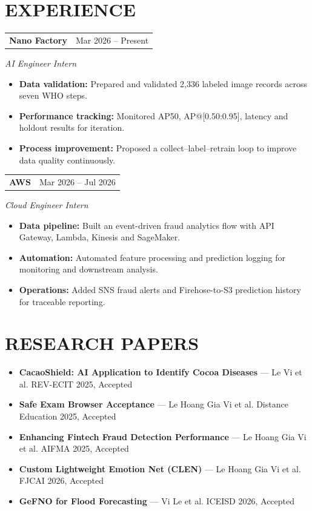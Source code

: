 \documentclass[10pt,letterpaper]{article}
\makeatletter
\newcommand{\cvsection}[2]{\section*{\faIcon{#1}\hspace{0.45em}#2}}
\newcommand{\cvjobentry}[3]{%
  \begin{tabularx}{\textwidth}{@{}X>{\raggedleft\arraybackslash}p{1.52in}@{}}
    \textbf{#1} & \normalsize #2 \\
  \end{tabularx}\par
  \vspace{0.10em}\normalsize\textit{#3}\par\vspace{0.08em}
}
\newcommand{\paperentry}[3]{%
  \item \small \textbf{#1} --- #2 \hfill #3
}
\makeatother
\begin{document}
\cvsection{briefcase}{EXPERIENCE}
\cvjobentry{Nano Factory}{Mar 2026 -- Present}{AI Engineer Intern}
\begin{itemize}[leftmargin=1.75em,itemsep=0.10em,topsep=0.16em]
  \item \normalsize \textbf{Data validation:} Prepared and validated 2,336 labeled image records across seven WHO steps.
  \item \normalsize \textbf{Performance tracking:} Monitored AP50, AP@[0.50:0.95], latency and holdout results for iteration.
  \item \normalsize \textbf{Process improvement:} Proposed a collect--label--retrain loop to improve data quality continuously.
\end{itemize}
\vspace{0.45em}
\cvjobentry{AWS}{Mar 2026 -- Jul 2026}{Cloud Engineer Intern}
\begin{itemize}[leftmargin=1.75em,itemsep=0.10em,topsep=0.16em]
  \item \normalsize \textbf{Data pipeline:} Built an event-driven fraud analytics flow with API Gateway, Lambda, Kinesis and SageMaker.
  \item \normalsize \textbf{Automation:} Automated feature processing and prediction logging for monitoring and downstream analysis.
  \item \normalsize \textbf{Operations:} Added SNS fraud alerts and Firehose-to-S3 prediction history for traceable reporting.
\end{itemize}

\cvsection{book}{RESEARCH PAPERS}
\begin{itemize}[leftmargin=1.45em,itemsep=0em,topsep=0em,parsep=0em,partopsep=0em]
  \paperentry{CacaoShield: AI Application to Identify Cocoa Diseases}{Le Vi et al.}{REV-ECIT 2025, Accepted}
  \paperentry{Safe Exam Browser Acceptance}{Le Hoang Gia Vi et al.}{Distance Education 2025, Accepted}
  \paperentry{Enhancing Fintech Fraud Detection Performance}{Le Hoang Gia Vi et al.}{AIFMA 2025, Accepted}
  \paperentry{Custom Lightweight Emotion Net (CLEN)}{Le Hoang Gia Vi et al.}{FJCAI 2026, Accepted}
  \paperentry{GeFNO for Flood Forecasting}{Vi Le et al.}{ICEISD 2026, Accepted}
\end{itemize}
\end{document}

